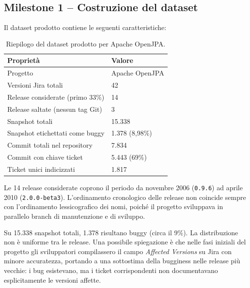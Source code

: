 \subsection{Milestone 1 -- Costruzione del dataset}

Il dataset prodotto contiene le seguenti caratteristiche:

\begin{table}[h!]
\centering
\begin{tabular}{@{}ll@{}}
\toprule
\textbf{Proprietà} & \textbf{Valore} \\
\midrule
Progetto & Apache OpenJPA \\
Versioni Jira totali & 42 \\
Release considerate (primo 33\%) & 14 \\
Release saltate (nessun tag Git) & 3 \\
Snapshot totali & 15.338 \\
Snapshot etichettati come buggy & 1.378 (8,98\%) \\
Commit totali nel repository & 7.834 \\
Commit con chiave ticket & 5.443 (69\%) \\
Ticket unici indicizzati & 1.817 \\
\bottomrule
\end{tabular}
\caption{Riepilogo del dataset prodotto per Apache OpenJPA.}
\end{table}

Le 14 release considerate coprono il periodo da novembre 2006 (\texttt{0.9.6}) ad aprile
2010 (\texttt{2.0.0-beta3}). L'ordinamento cronologico delle release non coincide sempre
con l'ordinamento lessicografico dei nomi, poiché il progetto sviluppava in parallelo
branch di manutenzione e di sviluppo.

Su 15.338 snapshot totali, 1.378 risultano buggy (circa il 9\%). La distribuzione non è
uniforme tra le release. Una possibile spiegazione è che nelle fasi iniziali del progetto
gli sviluppatori compilassero il campo \textit{Affected Versions} su Jira con minore
accuratezza, portando a una sottostima della bugginess nelle release più vecchie: i bug
esistevano, ma i ticket corrispondenti non documentavano esplicitamente le versioni
affette.
